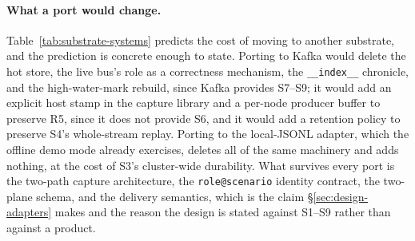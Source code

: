 \paragraph{What a port would change.} Table~\ref{tab:substrate-systems}
predicts the cost of moving to another substrate, and the prediction is
concrete enough to state. Porting to Kafka would delete the hot store, the
live bus's role as a correctness mechanism, the \texttt{\_\_index\_\_}
chronicle, and the high-water-mark rebuild, since Kafka provides S7--S9;
it would add an explicit host stamp in the capture library and a per-node
producer buffer to preserve R5, since it does not provide S6, and it would
add a retention policy to preserve S4's whole-stream replay. Porting to the
local-JSONL adapter, which the offline demo mode already exercises, deletes
all of the same machinery and adds nothing, at the cost of S3's cluster-wide
durability. What survives every port is the two-path capture architecture,
the \texttt{role@scenario} identity contract, the two-plane schema, and the
delivery semantics, which is the claim \S\ref{sec:design-adapters} makes and
the reason the design is stated against S1--S9 rather than against a
product.
